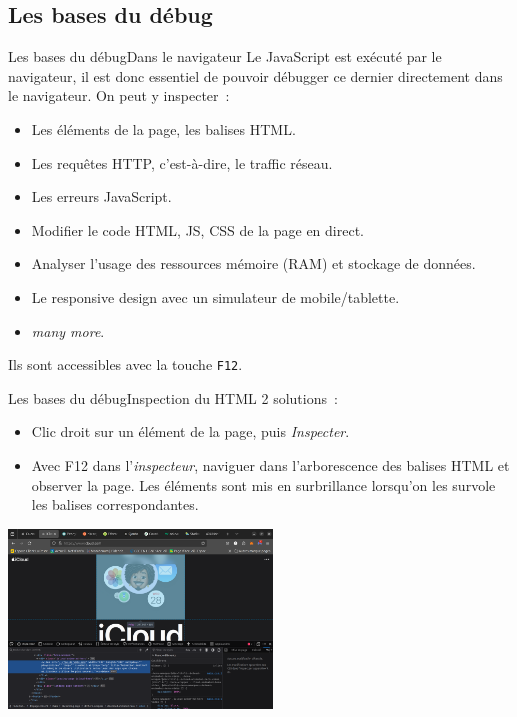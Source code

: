 \documentclass{beamer}
\begin{document}
    \subsection{Les bases du débug}\label{sec:debugbasics}
    \begin{frame}{Les bases du débug}{Dans le navigateur}
        Le JavaScript est exécuté par le navigateur, il est donc essentiel de pouvoir débugger ce dernier directement dans le navigateur.
        \bigbreak
        On peut y inspecter~:
        \begin{itemize}
            \item Les éléments de la page, les balises HTML.
            \item Les requêtes HTTP, c’est-à-dire, le traffic réseau.
            \item Les erreurs JavaScript.
            \item Modifier le code HTML, JS, CSS de la page en direct.
            \item Analyser l'usage des ressources mémoire (RAM) et stockage de données.
            \item Le responsive design avec un simulateur de mobile/tablette.
            \item \textit{many more}.
        \end{itemize}
        Ils sont accessibles avec la touche \texttt{F12}.
    \end{frame}

    \begin{frame}{Les bases du débug}{Inspection du HTML}
        2 solutions~:
        \begin{itemize}
            \item Clic droit sur un élément de la page, puis \textit{Inspecter}.
            \item Avec F12 dans l'\textit{inspecteur}, naviguer dans l'arborescence des balises HTML et observer la page.
            Les éléments sont mis en surbrillance lorsqu'on les survole les balises correspondantes.
        \end{itemize}
        \bigbreak
        \centering
        \includegraphics[width=7cm]{image/inspector-highlight}
    \end{frame}
\end{document}
